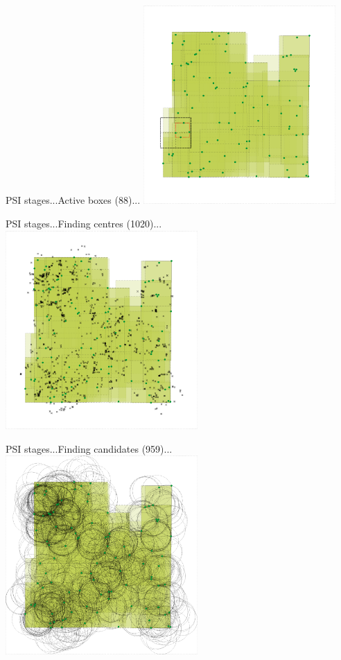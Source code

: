 \documentclass{beamer}
\begin{document}
\begin{frame}{PSI stages...}{Active boxes (88)...}
    \centering
    \includegraphics[width=0.55\textwidth]{figures/psi05}
\end{frame}

\begin{frame}{PSI stages...}{Finding centres (1020)...}
    \centering
    \includegraphics[width=0.55\textwidth]{figures/psi_centres}
\end{frame}

\begin{frame}{PSI stages...}{Finding candidates (959)...}
    \centering
    \includegraphics[width=0.55\textwidth]{figures/psi_candidates}
\end{frame}
\end{document}
